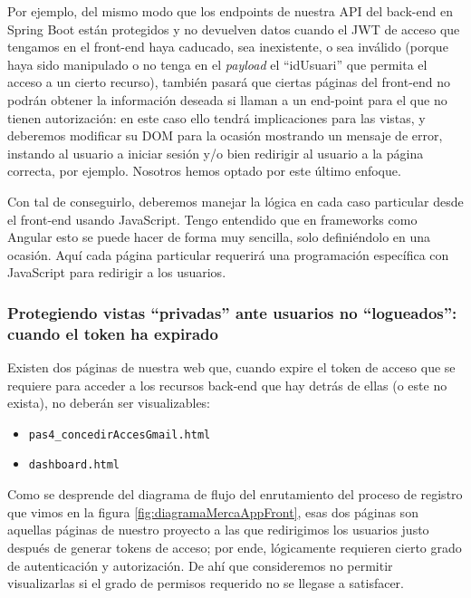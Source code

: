 \documentclass[a4paper,12pt]{report}
\begin{document}
	Por ejemplo, del mismo modo que los endpoints de nuestra API del back-end en Spring Boot están protegidos y no devuelven datos cuando el JWT de acceso que tengamos en el front-end haya caducado, sea inexistente, o sea inválido (porque haya sido manipulado o no tenga en el \textit{payload} el ``idUsuari'' que permita el acceso a un cierto recurso), también pasará que ciertas páginas del front-end no podrán obtener la información deseada si llaman a un end-point para el que no tienen autorización: en este caso ello tendrá implicaciones para las vistas, y deberemos modificar su DOM para la ocasión mostrando un mensaje de error, instando al usuario a iniciar sesión y/o bien redirigir al usuario a la página correcta, por ejemplo. Nosotros hemos optado por este último enfoque.
	
	Con tal de conseguirlo, deberemos manejar la lógica en cada caso particular desde el front-end usando JavaScript. Tengo entendido que en frameworks como Angular esto se puede hacer de forma muy sencilla, solo definiéndolo en una ocasión. Aquí cada página particular requerirá una programación específica con JavaScript para redirigir a los usuarios.
	
	\subsubsection{Protegiendo vistas ``privadas'' ante usuarios no ``logueados'': cuando el token ha expirado}
	
	Existen dos páginas de nuestra web que, cuando expire el token de acceso que se requiere para acceder a los recursos back-end que hay detrás de ellas (o este no exista), no deberán ser visualizables:
	
	\vspace{0em}
	\begin{itemize}
		\setlength{\itemsep}{-.5em}
		\item \texttt{pas4\_concedirAccesGmail.html}
		\item \texttt{dashboard.html}
	\end{itemize}
	
	Como se desprende del diagrama de flujo del enrutamiento del proceso de registro que vimos en la figura \ref{fig:diagramaMercaAppFront}, esas dos páginas son aquellas páginas de nuestro proyecto a las que redirigimos los usuarios justo después de generar tokens de acceso; por ende, lógicamente requieren cierto grado de autenticación y autorización. De ahí que consideremos no permitir visualizarlas si el grado de permisos requerido no se llegase a satisfacer.
	
\end{document}
